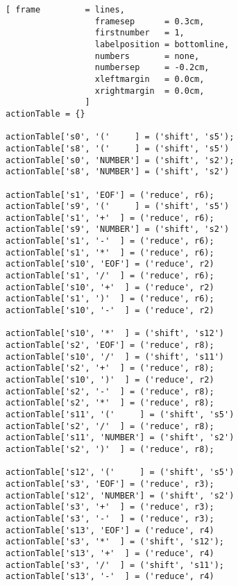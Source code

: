 \begin{figure}[!ht]
\centering
\begin{Verbatim}[ frame         = lines, 
                  framesep      = 0.3cm, 
                  firstnumber   = 1,
                  labelposition = bottomline,
                  numbers       = none,
                  numbersep     = -0.2cm,
                  xleftmargin   = 0.0cm,
                  xrightmargin  = 0.0cm,
                ]
actionTable = {}

actionTable['s0', '('     ] = ('shift', 's5');  actionTable['s8', '('     ] = ('shift', 's5')   
actionTable['s0', 'NUMBER'] = ('shift', 's2');  actionTable['s8', 'NUMBER'] = ('shift', 's2')   
                                                                                         
actionTable['s1', 'EOF'] = ('reduce', r6);      actionTable['s9', '('     ] = ('shift', 's5')   
actionTable['s1', '+'  ] = ('reduce', r6);      actionTable['s9', 'NUMBER'] = ('shift', 's2')   
actionTable['s1', '-'  ] = ('reduce', r6);                                                   
actionTable['s1', '*'  ] = ('reduce', r6);      actionTable['s10', 'EOF'] = ('reduce', r2)   
actionTable['s1', '/'  ] = ('reduce', r6);      actionTable['s10', '+'  ] = ('reduce', r2)    
actionTable['s1', ')'  ] = ('reduce', r6);      actionTable['s10', '-'  ] = ('reduce', r2)    
                                                actionTable['s10', '*'  ] = ('shift', 's12')
actionTable['s2', 'EOF'] = ('reduce', r8);      actionTable['s10', '/'  ] = ('shift', 's11')  
actionTable['s2', '+'  ] = ('reduce', r8);      actionTable['s10', ')'  ] = ('reduce', r2)    
actionTable['s2', '-'  ] = ('reduce', r8);                                                   
actionTable['s2', '*'  ] = ('reduce', r8);      actionTable['s11', '('     ] = ('shift', 's5')  
actionTable['s2', '/'  ] = ('reduce', r8);      actionTable['s11', 'NUMBER'] = ('shift', 's2')  
actionTable['s2', ')'  ] = ('reduce', r8);                                                   
                                                actionTable['s12', '('     ] = ('shift', 's5')  
actionTable['s3', 'EOF'] = ('reduce', r3);      actionTable['s12', 'NUMBER'] = ('shift', 's2')  
actionTable['s3', '+'  ] = ('reduce', r3);                                                   
actionTable['s3', '-'  ] = ('reduce', r3);      actionTable['s13', 'EOF'] = ('reduce', r4)   
actionTable['s3', '*'  ] = ('shift', 's12');    actionTable['s13', '+'  ] = ('reduce', r4)   
actionTable['s3', '/'  ] = ('shift', 's11');    actionTable['s13', '-'  ] = ('reduce', r4)   

\end{Verbatim}
\end{figure}
